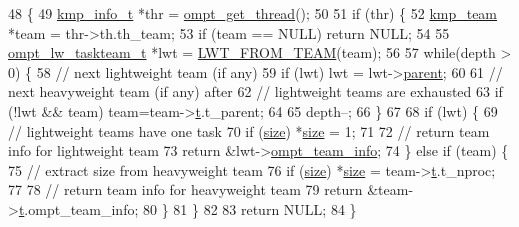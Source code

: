 \begin{DoxyCode}
48 \{
49     \hyperlink{kmp_8h_a194859801fe16b326efe34501a37c30a}{kmp\_info\_t} *thr = \hyperlink{ompt-specific_8h_ae3f900aeae1828089c356b1db2be6fee}{ompt\_get\_thread}();
50 
51     \textcolor{keywordflow}{if} (thr) \{
52         \hyperlink{unionkmp__team}{kmp\_team} *team = thr->th.th\_team;
53         \textcolor{keywordflow}{if} (team == NULL) \textcolor{keywordflow}{return} NULL;
54 
55         \hyperlink{structompt__lw__taskteam__s}{ompt\_lw\_taskteam\_t} *lwt = \hyperlink{ompt-specific_8c_a9dc12459c8279002a0191618e32c5366}{LWT\_FROM\_TEAM}(team);
56 
57         \textcolor{keywordflow}{while}(depth > 0) \{
58             \textcolor{comment}{// next lightweight team (if any)}
59             \textcolor{keywordflow}{if} (lwt) lwt = lwt->\hyperlink{structompt__lw__taskteam__s_ac945aa2df678ab63f63a5f23ea796974}{parent};
60 
61             \textcolor{comment}{// next heavyweight team (if any) after}
62             \textcolor{comment}{// lightweight teams are exhausted}
63             \textcolor{keywordflow}{if} (!lwt && team) team=team->\hyperlink{unionkmp__team_a87cf4571108a61b446e809094f8c0362}{t}.t\_parent;
64 
65             depth--;
66         \}
67 
68         \textcolor{keywordflow}{if} (lwt) \{
69             \textcolor{comment}{// lightweight teams have one task}
70             \textcolor{keywordflow}{if} (\hyperlink{ittnotify__static_8h_a5a1daa0c1d342747e3884fa54fc64fb1}{size}) *\hyperlink{ittnotify__static_8h_a5a1daa0c1d342747e3884fa54fc64fb1}{size} = 1;
71 
72             \textcolor{comment}{// return team info for lightweight team}
73             \textcolor{keywordflow}{return} &lwt->\hyperlink{structompt__lw__taskteam__s_a548ab004e1bed7cea20532f1e168ce3d}{ompt\_team\_info};
74         \} \textcolor{keywordflow}{else} \textcolor{keywordflow}{if} (team) \{
75             \textcolor{comment}{// extract size from heavyweight team}
76             \textcolor{keywordflow}{if} (\hyperlink{ittnotify__static_8h_a5a1daa0c1d342747e3884fa54fc64fb1}{size}) *\hyperlink{ittnotify__static_8h_a5a1daa0c1d342747e3884fa54fc64fb1}{size} = team->\hyperlink{unionkmp__team_a87cf4571108a61b446e809094f8c0362}{t}.t\_nproc;
77 
78             \textcolor{comment}{// return team info for heavyweight team}
79             \textcolor{keywordflow}{return} &team->\hyperlink{unionkmp__team_a87cf4571108a61b446e809094f8c0362}{t}.ompt\_team\_info;
80         \}
81     \}
82 
83     \textcolor{keywordflow}{return} NULL;
84 \}
\end{DoxyCode}
